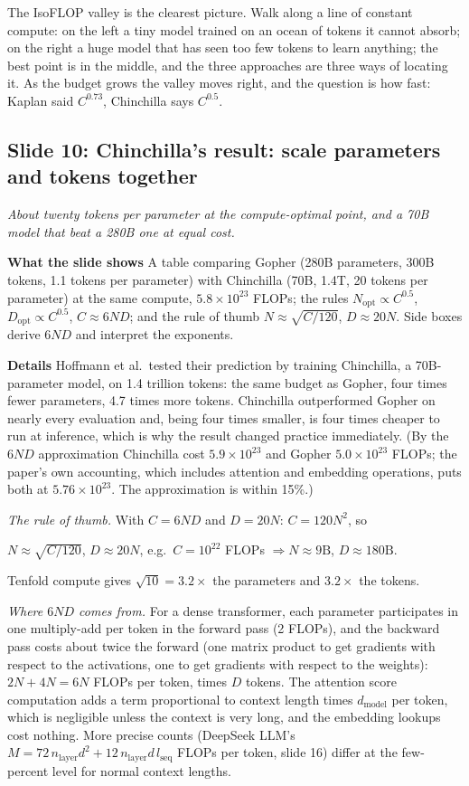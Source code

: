 \documentclass[11pt,letterpaper]{article}
\newcommand{\slide}[3]{%
  \subsection[Slide #1: #2]{Slide #1: #2}%
  {\color{muted}\itshape #3\par}\medskip}
\newcommand{\para}[1]{\medskip\noindent\textbf{#1}\quad}
\newenvironment{intuition}{\begin{tcolorbox}[intuitionbox]}{\end{tcolorbox}}
\newenvironment{formulas}{\begin{tcolorbox}[formulabox]}{\end{tcolorbox}}
\newcommand{\Nopt}{N_{\mathrm{opt}}}
\newcommand{\Dopt}{D_{\mathrm{opt}}}
\begin{document}
\begin{intuition}
The IsoFLOP valley is the clearest picture. Walk along a line of constant compute: on the left a tiny model trained on an ocean of tokens it cannot absorb; on the right a huge model that has seen too few tokens to learn anything; the best point is in the middle, and the three approaches are three ways of locating it. As the budget grows the valley moves right, and the question is how fast: Kaplan said $C^{0.73}$, Chinchilla says $C^{0.5}$.
\end{intuition}

\slide{10}{Chinchilla's result: scale parameters and tokens together}{About twenty tokens per parameter at the compute-optimal point, and a 70B model that beat a 280B one at equal cost.}

\para{What the slide shows} A table comparing Gopher (280B parameters, 300B tokens, 1.1 tokens per parameter) with Chinchilla (70B, 1.4T, 20 tokens per parameter) at the same compute, $5.8\times10^{23}$ FLOPs; the rules $\Nopt\propto C^{0.5}$, $\Dopt\propto C^{0.5}$, $C\approx6ND$; and the rule of thumb $N\approx\sqrt{C/120}$, $D\approx20N$. Side boxes derive $6ND$ and interpret the exponents.

\para{Details} Hoffmann et al.\ tested their prediction by training Chinchilla, a 70B-parameter model, on 1.4 trillion tokens: the same budget as Gopher, four times fewer parameters, 4.7 times more tokens. Chinchilla outperformed Gopher on nearly every evaluation and, being four times smaller, is four times cheaper to run at inference, which is why the result changed practice immediately. (By the $6ND$ approximation Chinchilla cost $5.9\times10^{23}$ and Gopher $5.0\times10^{23}$ FLOPs; the paper's own accounting, which includes attention and embedding operations, puts both at $5.76\times10^{23}$. The approximation is within 15\%.)

\emph{The rule of thumb.} With $C=6ND$ and $D=20N$: $C=120N^2$, so
\begin{formulas}
$N\approx\sqrt{C/120}$, \qquad $D\approx20N$, \qquad e.g.\ $C=10^{22}$ FLOPs $\Rightarrow N\approx9\text{B}$, $D\approx180\text{B}$.
\end{formulas}
Tenfold compute gives $\sqrt{10}=3.2\times$ the parameters and $3.2\times$ the tokens.

\emph{Where $6ND$ comes from.} For a dense transformer, each parameter participates in one multiply-add per token in the forward pass (2 FLOPs), and the backward pass costs about twice the forward (one matrix product to get gradients with respect to the activations, one to get gradients with respect to the weights): $2N+4N=6N$ FLOPs per token, times $D$ tokens. The attention score computation adds a term proportional to context length times $d_{\text{model}}$ per token, which is negligible unless the context is very long, and the embedding lookups cost nothing. More precise counts (DeepSeek LLM's $M=72\,n_{\text{layer}}d^2+12\,n_{\text{layer}}d\,l_{\text{seq}}$ FLOPs per token, slide 16) differ at the few-percent level for normal context lengths.
\end{document}
